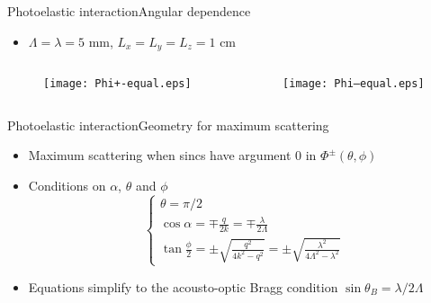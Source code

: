 \documentclass[11pt]{beamer}
\begin{document}
	\begin{frame}{Photoelastic interaction}{Angular dependence}
		\begin{itemize}
			\item $\Lambda = \lambda = 5$ mm, $L_x = L_y = L_z = 1$ cm
		\end{itemize}
		\begin{columns}
			\begin{column}{0.5\textwidth}
				\begin{figure}
					\centering
					\texttt{[image: Phi+-equal.eps]}
				\end{figure}
			\end{column}
			\begin{column}{0.5\textwidth}
				\begin{figure}
					\centering
					\texttt{[image: Phi--equal.eps]}
				\end{figure}
			\end{column}
		\end{columns}
	\end{frame}
	
	\begin{frame}{Photoelastic interaction}{Geometry for maximum scattering}
		\pause
		\begin{itemize}
			\item Maximum scattering when sincs have argument 0 in $\Phi^\pm(\theta,\phi)$ \pause
			\item Conditions on $\alpha$, $\theta$ and $\phi$
			\begin{equation*}
				\begin{cases}
					\theta = \pi/2 \\
					\cos{\alpha} = \mp \frac{q}{2k} = \mp \frac{\lambda}{2\Lambda} \\
					\tan{\frac{\phi}{2}} = \pm \sqrt{\frac{q^2}{4k^2-q^2}} = \pm \sqrt{\frac{\lambda^2}{4\Lambda^2-\lambda^2}}
				\end{cases}
			\end{equation*} \pause
			\item Equations simplify to the acousto-optic Bragg condition $\sin{\theta_B} = \lambda/2\Lambda$
		\end{itemize}
	\end{frame}
	
\end{document}
